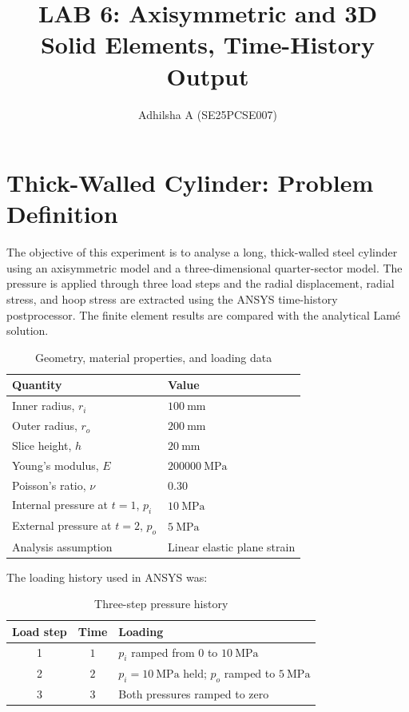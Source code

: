 
\title{LAB 6: Axisymmetric and 3D Solid Elements, Time-History Output}

\author{Adhilsha A (SE25PCSE007)}
\maketitle

\tableofcontents

\section{Thick-Walled Cylinder: Problem Definition}

The objective of this experiment is to analyse a long, thick-walled steel
cylinder using an axisymmetric model and a three-dimensional quarter-sector
model.  The pressure is applied through three load steps and the radial
displacement, radial stress, and hoop stress are extracted using the ANSYS
time-history postprocessor.  The finite element results are compared with the
analytical Lam\'e solution.

\begin{table}[h!]
\centering
\begin{tabular}{ll}
\toprule
\textbf{Quantity} & \textbf{Value} \\
\midrule
Inner radius, $r_i$ & $\SI{100}{\milli\metre}$ \\
Outer radius, $r_o$ & $\SI{200}{\milli\metre}$ \\
Slice height, $h$ & $\SI{20}{\milli\metre}$ \\
Young's modulus, $E$ & $\SI{200000}{\mega\pascal}$ \\
Poisson's ratio, $\nu$ & $0.30$ \\
Internal pressure at $t=1$, $p_i$ & $\SI{10}{\mega\pascal}$ \\
External pressure at $t=2$, $p_o$ & $\SI{5}{\mega\pascal}$ \\
Analysis assumption & Linear elastic plane strain \\
\bottomrule
\end{tabular}
\caption{Geometry, material properties, and loading data}
\end{table}

The loading history used in ANSYS was:
\begin{table}[h!]
\centering
\begin{tabular}{ccl}
\toprule
\textbf{Load step} & \textbf{Time} & \textbf{Loading} \\
\midrule
1 & $1$ & $p_i$ ramped from $0$ to $\SI{10}{\mega\pascal}$ \\
2 & $2$ & $p_i=\SI{10}{\mega\pascal}$ held; $p_o$ ramped to $\SI{5}{\mega\pascal}$ \\
3 & $3$ & Both pressures ramped to zero \\
\bottomrule
\end{tabular}
\caption{Three-step pressure history}
\end{table}

